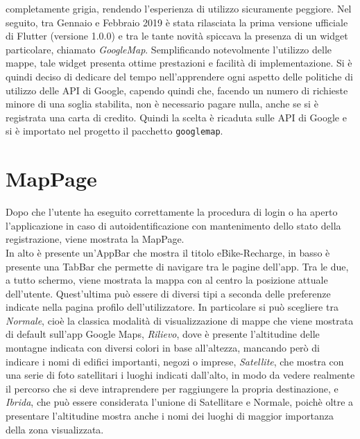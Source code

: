 completamente grigia, rendendo l'esperienza di utilizzo sicuramente peggiore.
Nel seguito, tra Gennaio e Febbraio 2019 è stata rilasciata la prima versione
ufficiale di Flutter (versione 1.0.0) e tra le tante novità spiccava la presenza
di un widget particolare, chiamato \textit{GoogleMap}. Semplificando notevolmente
l'utilizzo delle mappe, tale widget presenta ottime prestazioni e facilità di
implementazione. Si è quindi deciso di dedicare del tempo nell'apprendere ogni
aspetto delle politiche di utilizzo delle API di Google, capendo quindi che,
facendo un numero di richieste minore di una soglia stabilita, non è necessario
pagare nulla, anche se si è registrata una carta di credito. Quindi la scelta è
ricaduta sulle API di Google e si è importato nel progetto il pacchetto
\verb|googlemap|.

\section{MapPage}
Dopo che l'utente ha eseguito correttamente la procedura di login o ha aperto
l'applicazione in caso di autoidentificazione con mantenimento dello stato della
registrazione, viene mostrata la MapPage. \\
In alto è presente un'AppBar che 
mostra il titolo eBike-Recharge, in basso è presente una TabBar che permette di
navigare tra le pagine dell'app. Tra le due, a tutto schermo, viene mostrata la
mappa con al centro la posizione attuale dell'utente. Quest'ultima può essere di
diversi tipi a seconda delle preferenze indicate nella pagina profilo
dell'utilizzatore. In particolare si può scegliere tra \textit{Normale}, cioè la
classica modalità di visualizzazione di mappe che viene mostrata di default
sull'app Google Maps, \textit{Rilievo}, dove è presente l'altitudine delle
montagne indicata con diversi colori in base all'altezza, mancando però
di indicare i nomi di edifici importanti, negozi o imprese, \textit{Satellite},
che mostra con una serie di foto satellitari i luoghi indicati dall'alto, in
modo da vedere realmente il percorso che si deve intraprendere
per raggiungere la propria destinazione, e \textit{Ibrida}, che può essere
considerata l'unione di Satellitare e Normale, poichè oltre a presentare
l'altitudine mostra anche i nomi dei luoghi di maggior importanza della zona
visualizzata.

